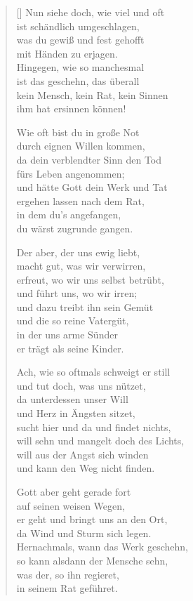 \begin{multicols}{2}
\begin{verse}[\versewidth]
 Nun siehe doch, wie viel und oft\\
ist schändlich umgeschlagen,\\
was du gewiß und fest gehofft\\
mit Händen zu erjagen.\\
Hingegen, wie so manchesmal\\
ist das geschehn, das überall\\
kein Mensch, kein Rat, kein Sinnen\\
ihm hat ersinnen können!

 Wie oft bist du in große Not\\
durch eignen Willen kommen,\\
da dein verblendter Sinn den Tod\\
fürs Leben angenommen;\\
und hätte Gott dein Werk und Tat\\
ergehen lassen nach dem Rat,\\
in dem du's angefangen,\\
du wärst zugrunde gangen.

 Der aber, der uns ewig liebt,\\
macht gut, was wir verwirren,\\
erfreut, wo wir uns selbst betrübt,\\
und führt uns, wo wir irren;\\
und dazu treibt ihn sein Gemüt\\
und die so reine Vatergüt,\\
in der uns arme Sünder\\
er trägt als seine Kinder.

 Ach, wie so oftmals schweigt er still\\
und tut doch, was uns nützet,\\
da unterdessen unser Will\\
und Herz in Ängsten sitzet,\\
sucht hier und da und findet nichts,\\
will sehn und mangelt doch des Lichts,\\
will aus der Angst sich winden\\
und kann den Weg nicht finden.

 Gott aber geht gerade fort\\
auf seinen weisen Wegen,\\
er geht und bringt uns an den Ort,\\
da Wind und Sturm sich legen.\\
Hernachmals, wann das Werk geschehn,\\
so kann alsdann der Mensche sehn,\\
was der, so ihn regieret,\\
in seinem Rat geführet.


\end{verse}
\end{multicols}
